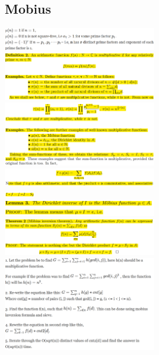 \documentclass[8pt, a4paper, oneside, twocolumn]{extarticle}
\begin{document}
\subsection{Mobius}
\includegraphics[width=0.5\textwidth,height=0.5\textheight,keepaspectratio]{mob0}
\\\includegraphics[width=0.5\textwidth,height=0.5\textheight,keepaspectratio]{mob1}
\\\includegraphics[width=0.5\textwidth,height=0.5\textheight,keepaspectratio]{mob2}
\\\includegraphics[width=0.5\textwidth,height=0.5\textheight,keepaspectratio]{mob3}
\\\includegraphics[width=0.1\textwidth,height=0.1\textheight,keepaspectratio]{mob4}
\\\includegraphics[width=0.5\textwidth,height=0.5\textheight,keepaspectratio]{mob5}
\\\includegraphics[width=0.5\textwidth,height=0.5\textheight,keepaspectratio]{mob6}
\\\includegraphics[width=0.5\textwidth,height=0.5\textheight,keepaspectratio]{mob7}
\end{document}
